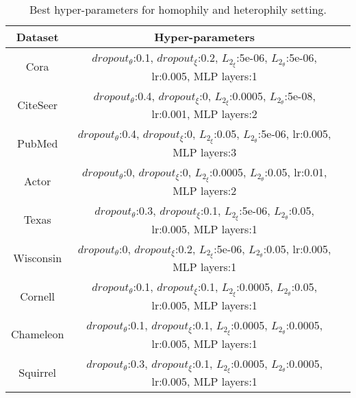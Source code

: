 \documentclass{article}
\begin{document}
\begin{table}
\caption{Best hyper-parameters for homophily and heterophily setting.}
\label{table.hyper.hete_homo}
\centering
\begin{tabular}{c|cc}

\toprule
Dataset & Hyper-parameters\\
\midrule
Cora & $dropout_{\theta}$:0.1, $dropout_{\xi}$:0.2, $L_{2_{\xi}}$:5e-06, $L_{2_{\theta}}$:5e-06, lr:0.005, MLP layers:1\\
\midrule
CiteSeer & $dropout_{\theta}$:0.4, $dropout_{\xi}$:0, $L_{2_{\xi}}$:0.0005, $L_{2_{\theta}}$:5e-08, lr:0.001, MLP layers:2\\
\midrule
PubMed & $dropout_{\theta}$:0.4, $dropout_{\xi}$:0, $L_{2_{\xi}}$:0.05, $L_{2_{\theta}}$:5e-06, lr:0.005, MLP layers:3\\
\midrule
Actor & $dropout_{\theta}$:0, $dropout_{\xi}$:0, $L_{2_{\xi}}$:0.0005, $L_{2_{\theta}}$:0.05, lr:0.01, MLP layers:2\\
\midrule
Texas & $dropout_{\theta}$:0.3, $dropout_{\xi}$:0.1, $L_{2_{\xi}}$:5e-06, $L_{2_{\theta}}$:0.05, lr:0.005, MLP layers:1\\
\midrule
Wisconsin & $dropout_{\theta}$:0, $dropout_{\xi}$:0.2, $L_{2_{\xi}}$:5e-06, $L_{2_{\theta}}$:0.05, lr:0.005, MLP layers:1\\
\midrule
Cornell & $dropout_{\theta}$:0.1, $dropout_{\xi}$:0.1, $L_{2_{\xi}}$:0.0005, $L_{2_{\theta}}$:0.05, lr:0.005, MLP layers:1\\
\midrule
Chameleon & $dropout_{\theta}$:0.1, $dropout_{\xi}$:0.1, $L_{2_{\xi}}$:0.0005, $L_{2_{\theta}}$:0.0005, lr:0.005, MLP layers:1\\
\midrule
Squirrel & $dropout_{\theta}$:0.3, $dropout_{\xi}$:0.1, $L_{2_{\xi}}$:0.0005, $L_{2_{\theta}}$:0.0005, lr:0.005, MLP layers:1\\
\bottomrule

\end{tabular}
\end{table}
\end{document}
